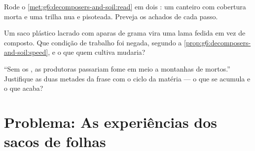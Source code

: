 \begin{exercise}[$\star\star$]\label{exo:g6:decomposers-and-soil:10}
Rode o \cref{met:g6:decomposers-and-soil:read} em dois : um
canteiro com cobertura morta e uma trilha nua e pisoteada. Preveja os
achados de cada passo.
\end{exercise}

\begin{exercise}[$\star\star$]\label{exo:g6:decomposers-and-soil:11}
Um saco plástico lacrado com aparas de grama vira uma lama fedida em
vez de composto. Que condição de trabalho foi negada, segundo a
\cref{prop:g6:decomposers-and-soil:speed}, e o que quem cultiva
mudaria?
\end{exercise}

\begin{exercise}[$\star\star\star$]\label{exo:g6:decomposers-and-soil:12}
``Sem os , as produtoras passariam fome em meio a
montanhas de mortos.'' Justifique as duas metades da frase com o ciclo
da matéria --- o que se acumula e o que acaba?
\end{exercise}

\section{Problema: As experiências dos sacos de folhas}


